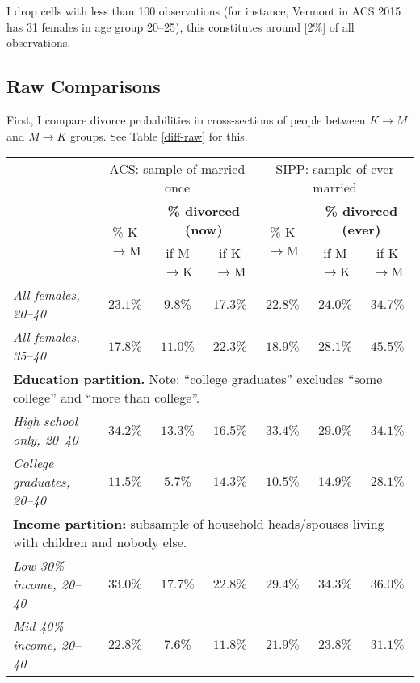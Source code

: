 \documentclass[12pt,letter]{article}
\begin{document}
I drop cells with less than 100 observations (for instance, Vermont in ACS 2015 has 31 females in age group 20--25), this constitutes around [2\%] of all observations. 

\subsection{Raw Comparisons}
First, I compare divorce probabilities in cross-sections of people between $K\to M$ and $M\to K$ groups. See Table \ref{diff-raw} for this.

\begin{table}[h!]
\begin{center}
\begin{tabular}{|l|c||c|c||c||c|c|}\cline{2-7}
\multicolumn{1}{c|}{} & \multicolumn{3}{c||}{\small ACS: sample of married once} & \multicolumn{3}{c|}{\small SIPP: sample of  ever married} \\\cline{2-7}
\multicolumn{1}{c|}{}  & \multirow{2}{*}{\small \% K$\to$M}& \multicolumn{2}{c||}{\textbf{\% divorced (now)}} & \multirow{2}{*}{\footnotesize \% K$\to$M }& \multicolumn{2}{c|}{\textbf{\% divorced (ever)}} \\\cline{3-4}\cline{6-7}
\multicolumn{1}{c|}{}  &  &\small if M$\to$K &  \small if K$\to$M & & \small if M$\to$K & \small if K$\to$M \\\hline
\textit{All females, 20--40}  & $23.1\%$ & $9.8\%$ & $17.3\%$ & $22.8\%$ & $24.0\%$ & $34.7\%$ \\
\textit{All females, 35--40} & $17.8\%$ & $11.0\%$ & $22.3\%$ & $18.9\%$ & $28.1\%$ & $45.5\%$ \\\hline\hline
\multicolumn{7}{|p{0.9\linewidth}|}{\footnotesize \textbf{Education partition.} Note: ``college graduates'' excludes ``some college'' and ``more than college''.}\\\hline
\textit{High school only, 20--40} & $34.2\%$ & $13.3\%$ & $16.5\%$ & $33.4\%$ & $29.0\%$  & $34.1\%$ \\
\textit{College graduates, 20--40} & $11.5\%$ & $5.7\%$ & $14.3\%$ & $10.5\%$ & $14.9\%$ & $28.1\%$ \\\hline\hline
\multicolumn{7}{|p{0.9\linewidth}|}{\footnotesize \textbf{Income partition:} subsample of household heads/spouses living with children and nobody else.}\\\hline
\textit{Low 30\% income, 20--40} & $33.0\%$ & $17.7\%$ & $22.8\%$ & $29.4\%$ & $34.3\%$ &  $36.0\%$ \\
\textit{Mid 40\% income, 20--40} & $22.8\%$ & $7.6\%$ & $11.8\%$ & $21.9\%$ & $23.8\%$ & $31.1\%$ \\

\end{tabular}
\end{center}
\end{table}
\end{document}
